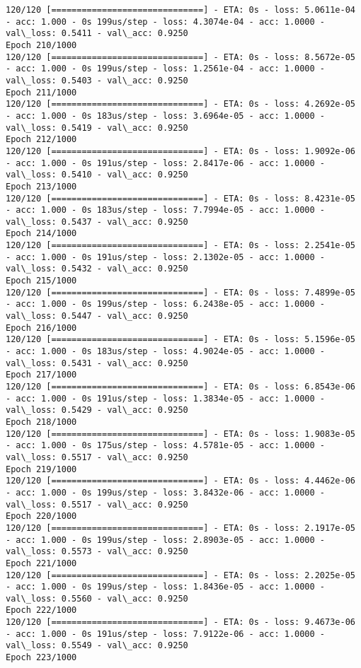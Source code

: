 \documentclass[11pt]{article}
\begin{document}
\begin{Verbatim}[commandchars=\\\{\}]
120/120 [==============================] - ETA: 0s - loss: 5.0611e-04 - acc: 1.000 - 0s 199us/step - loss: 4.3074e-04 - acc: 1.0000 - val\_loss: 0.5411 - val\_acc: 0.9250
Epoch 210/1000
120/120 [==============================] - ETA: 0s - loss: 8.5672e-05 - acc: 1.000 - 0s 199us/step - loss: 1.2561e-04 - acc: 1.0000 - val\_loss: 0.5403 - val\_acc: 0.9250
Epoch 211/1000
120/120 [==============================] - ETA: 0s - loss: 4.2692e-05 - acc: 1.000 - 0s 183us/step - loss: 3.6964e-05 - acc: 1.0000 - val\_loss: 0.5419 - val\_acc: 0.9250
Epoch 212/1000
120/120 [==============================] - ETA: 0s - loss: 1.9092e-06 - acc: 1.000 - 0s 191us/step - loss: 2.8417e-06 - acc: 1.0000 - val\_loss: 0.5410 - val\_acc: 0.9250
Epoch 213/1000
120/120 [==============================] - ETA: 0s - loss: 8.4231e-05 - acc: 1.000 - 0s 183us/step - loss: 7.7994e-05 - acc: 1.0000 - val\_loss: 0.5437 - val\_acc: 0.9250
Epoch 214/1000
120/120 [==============================] - ETA: 0s - loss: 2.2541e-05 - acc: 1.000 - 0s 191us/step - loss: 2.1302e-05 - acc: 1.0000 - val\_loss: 0.5432 - val\_acc: 0.9250
Epoch 215/1000
120/120 [==============================] - ETA: 0s - loss: 7.4899e-05 - acc: 1.000 - 0s 199us/step - loss: 6.2438e-05 - acc: 1.0000 - val\_loss: 0.5447 - val\_acc: 0.9250
Epoch 216/1000
120/120 [==============================] - ETA: 0s - loss: 5.1596e-05 - acc: 1.000 - 0s 183us/step - loss: 4.9024e-05 - acc: 1.0000 - val\_loss: 0.5431 - val\_acc: 0.9250
Epoch 217/1000
120/120 [==============================] - ETA: 0s - loss: 6.8543e-06 - acc: 1.000 - 0s 191us/step - loss: 1.3834e-05 - acc: 1.0000 - val\_loss: 0.5429 - val\_acc: 0.9250
Epoch 218/1000
120/120 [==============================] - ETA: 0s - loss: 1.9083e-05 - acc: 1.000 - 0s 175us/step - loss: 4.5781e-05 - acc: 1.0000 - val\_loss: 0.5517 - val\_acc: 0.9250
Epoch 219/1000
120/120 [==============================] - ETA: 0s - loss: 4.4462e-06 - acc: 1.000 - 0s 199us/step - loss: 3.8432e-06 - acc: 1.0000 - val\_loss: 0.5517 - val\_acc: 0.9250
Epoch 220/1000
120/120 [==============================] - ETA: 0s - loss: 2.1917e-05 - acc: 1.000 - 0s 199us/step - loss: 2.8903e-05 - acc: 1.0000 - val\_loss: 0.5573 - val\_acc: 0.9250
Epoch 221/1000
120/120 [==============================] - ETA: 0s - loss: 2.2025e-05 - acc: 1.000 - 0s 199us/step - loss: 1.8436e-05 - acc: 1.0000 - val\_loss: 0.5560 - val\_acc: 0.9250
Epoch 222/1000
120/120 [==============================] - ETA: 0s - loss: 9.4673e-06 - acc: 1.000 - 0s 191us/step - loss: 7.9122e-06 - acc: 1.0000 - val\_loss: 0.5549 - val\_acc: 0.9250
Epoch 223/1000

\end{Verbatim}
\end{document}
